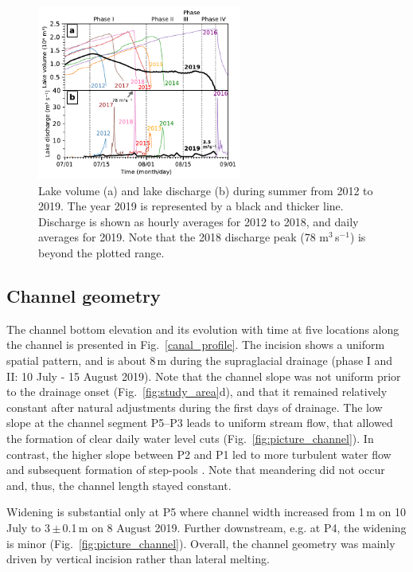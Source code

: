 \begin{figure}[h]
    \centering
    \includegraphics[width=0.6\textwidth]{chapters/chapter_plainemorte/fig02.pdf}
    \caption{Lake volume (a) and lake discharge (b) during summer from 2012 to 2019. The year 2019 is represented by a black and thicker line. Discharge is shown as  hourly averages for 2012 to 2018, and daily averages for 2019. Note that the 2018 discharge peak (78 m$^3$\,s$^{-1}$) is beyond the plotted range.}
    \label{fig:outburst}
\end{figure}

\subsection{Channel geometry}

The channel bottom elevation and its evolution with time at five locations along the channel is presented in Fig.~\ref{canal_profile}. The incision shows a uniform spatial pattern, and is about 8\,m during the supraglacial drainage (phase I and II: 10 July - 15 August 2019). Note that the channel slope was not uniform prior to the drainage onset (Fig.~\ref{fig:study_area}d), and that it remained relatively constant after natural adjustments during the first days of drainage. The low slope at the channel segment P5--P3 leads to uniform stream flow, that allowed the formation of clear daily water level cuts (Fig.~\ref{fig:picture_channel}). In contrast, the higher slope between P2 and P1 led to more turbulent water flow and subsequent formation of step-pools \citep[e.g.][]{Vatne&al2016}. Note that meandering \citep{Karlstrom&al2013} did not occur and, thus, the channel length stayed constant.

Widening is substantial only at P5 where channel width increased from 1\,m on 10 July to 3\,$\pm$\,0.1\,m on 8 August 2019. Further downstream, e.g. at P4, the widening is minor (Fig.~\ref{fig:picture_channel}). Overall, the channel geometry was mainly driven by vertical incision rather than lateral melting.



